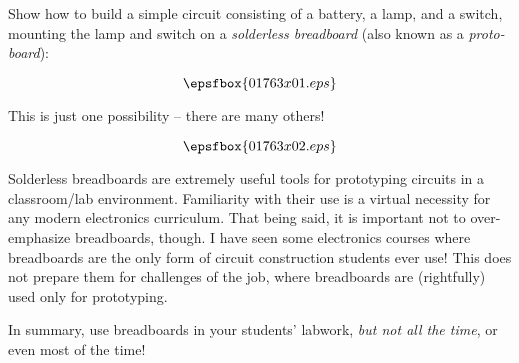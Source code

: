

Show how to build a simple circuit consisting of a battery, a lamp, and a switch, mounting the lamp and switch on a {\it solderless breadboard} (also known as a {\it proto-board}):

$$\epsfbox{01763x01.eps}$$







This is just one possibility -- there are many others!

$$\epsfbox{01763x02.eps}$$







Solderless breadboards are extremely useful tools for prototyping circuits in a classroom/lab environment.  Familiarity with their use is a virtual necessity for any modern electronics curriculum.  That being said, it is important not to over-emphasize breadboards, though.  I have seen some electronics courses where breadboards are the only form of circuit construction students ever use!  This does not prepare them for challenges of the job, where breadboards are (rightfully) used only for prototyping.

In summary, use breadboards in your students' labwork, {\it but not all the time}, or even most of the time!





